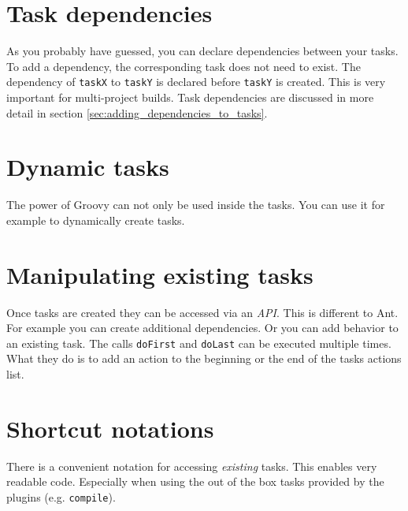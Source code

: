 \section{Task dependencies}
\label{sec:task_dependencies}
As you probably have guessed, you can declare dependencies between your tasks.
To add a dependency, the corresponding task does not need to exist. 
The dependency of \texttt{taskX} to \texttt{taskY} is declared before \texttt{taskY} is created. This is very important for multi-project builds.
Task dependencies are discussed in more detail in section \ref{sec:adding_dependencies_to_tasks}.

\section{Dynamic tasks}
The power of Groovy can not only be used inside the tasks. You can use it for example to dynamically create tasks.

\section{Manipulating existing tasks}
Once tasks are created they can be accessed via an \emph{API}. This is different to Ant. For example you can create additional dependencies.
Or you can add behavior to an existing task.
The calls \texttt{doFirst} and \texttt{doLast} can be executed multiple times. What they do is to add an action to the beginning or the end of the tasks actions list.

\section{Shortcut notations}
There is a convenient notation for accessing \emph{existing} tasks.
This enables very readable code. Especially when using the out of the box tasks provided by the plugins (e.g. \texttt{compile}).

